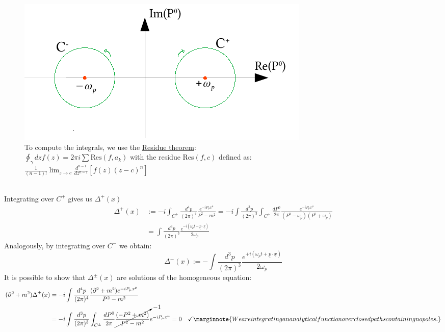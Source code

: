 \documentclass[../main.tex]{subfiles}
\begin{document}
\begin{figure}[h!]
    \includegraphics{Images/CamminiIntegrazione.pdf}
    \caption*{To compute the integrals, we use the \href{https://en.wikipedia.org/wiki/Residue_theorem}{Residue theorem}:\\ $\oint_\gamma dzf(z)=2\pi i\sum\text{Res}(f,a_k)$ with the residue Res$(f,c)$ defined as:\\$\frac{1}{(n-1)!}\lim_{z\to c}\frac{d^{n-1}}{dz^{n-1}}[f(z)(z-c)^n]$}
\end{figure}\\
\noindent
Integrating over $C^+$ gives us $\Delta^+(x)$
\begin{align*}
\Delta^+(x)&:=-i\int_{C^+}\frac{d^4p}{(2\pi)^4}\frac{e^{-iP_\mu x^\mu}}{P^2-m^2}=-i\int\frac{d^3p}{(2\pi)^3}\int_{C^+}\frac{dP^0}{2\pi}\frac{e^{-iP_\mu x^\mu}}{(P^0-\omega_p)(P^0+\omega_p)}\\
&=\int\frac{d^3p}{(2\pi)^3}\frac{e^{-i(\omega_pt-\underline{p}\cdot\underline{x})}}{2\omega_p}
\end{align*}
Analogously, by integrating over $C^-$ we obtain:
\[
\Delta^-(x):=-\int\frac{d^3p}{(2\pi)^3}\frac{e^{+i(\omega_pt+\underline{p}\cdot\underline{x})}}{2\omega_p}
\]
It is possible to show that $\Delta^\pm(x)$ are solutions of the homogeneous equation:
\begin{align*}
(\partial^2+m^2)\Delta^\pm(x)&=-i\int\frac{d^4p}{(2\pi)^4}\frac{(\partial^2+m^2)e^{-iP_\mu x^\mu}}{P^2-m^2}\\
&=-i\int\frac{d^3p}{(2\pi)^3}\int_{C^\pm}\frac{dP^0}{2\pi}\cancelto{-1}{\frac{(-P^2+m^2)}{P^2-m^2}}e^{-iP_\mu x^\mu}=0\quad \checkmark\marginnote{We are integrating an analytical function over closed paths containing no poles.}
\end{align*}
\end{document}
